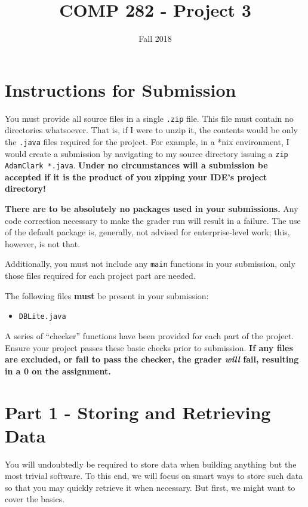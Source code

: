 \documentclass{article}
\begin{document}
\title{COMP 282 - Project 3}
\author{}
\date{Fall 2018}
\maketitle

\section*{Instructions for Submission}

You must provide all source files in a single \texttt{.zip} file.  This file
must contain no directories whatsoever.  That is, if I were to unzip it, the
contents would be only the \texttt{.java} files required for the project.  For
example, in a *nix environment, I would create a submission by navigating to my
source directory issuing a \texttt{zip AdamClark *.java}.  {\bf Under no
circumstances will a submission be accepted if it is the product of you zipping
your IDE's project directory!}

{\bf There are to be absolutely no packages used in your submissions.}  Any
code correction necessary to make the grader run will result in a failure.  The
use of the default package is, generally, not advised for enterprise-level
work; this, however, is not that.

Additionally, you must not include any \texttt{main} functions in your
submission, only those files required for each project part are needed.

The following files {\bf must} be present in your submission:

\begin{itemize}
\item \texttt{DBLite.java}
\end{itemize}

A series of ``checker'' functions have been provided for each part of the
project.  Ensure your project passes these basic checks prior to submission.
{\bf If any files are excluded, or fail to pass the checker, the grader {\em
will} fail, resulting in a 0 on the assignment.}

\section*{Part 1 - Storing and Retrieving Data}

You will undoubtedly be required to store data when building anything but the
most trivial software.  To this end, we will focus on smart ways to store such
data so that you may quickly retrieve it when necessary.  But first, we might
want to cover the basics.
\end{document}
